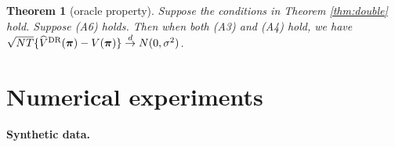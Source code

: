 \documentclass{article}
\newtheorem{thm}{Theorem}
\begin{document}
\begin{thm}[oracle property]\label{thm:oracleest}
	Suppose the conditions in Theorem \ref{thm:double} hold. Suppose (A6) holds. Then when both  (A3) and (A4) hold, we have  $\sqrt{NT} \{\widehat{V}^{\hbox{\scriptsize{DR}}}(\bm{\pi})-V(\bm{\pi})\}\stackrel{d}{\to} N(0,\sigma^2)$.
\end{thm}\vspace{-0.3cm}


\section{Numerical experiments}
\textbf{Synthetic data. }




	
\end{document}
